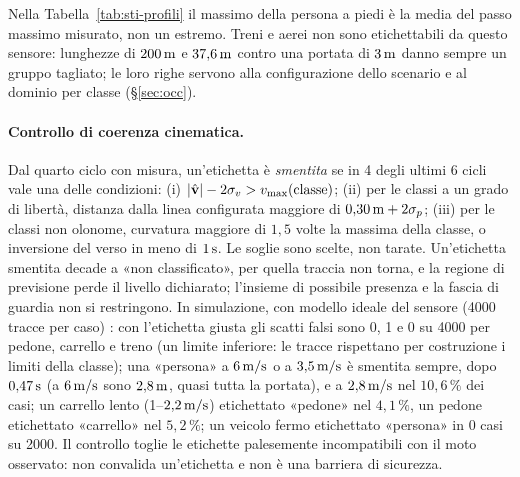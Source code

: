 Nella Tabella~\ref{tab:sti-profili} il massimo della persona a piedi è la media del passo massimo misurato, non un estremo. Treni e aerei non sono etichettabili da questo sensore: lunghezze di $200\,\mathrm{m}$ e $37{,}6\,\mathrm{m}$ contro una portata di $3\,\mathrm{m}$ danno sempre un gruppo tagliato; le loro righe servono alla configurazione dello scenario e al dominio per classe (\S\ref{sec:occ}).

\paragraph{Controllo di coerenza cinematica.} Dal quarto ciclo con misura, un'etichetta è \emph{smentita} se in 4 degli ultimi 6 cicli vale una delle condizioni: (i) $|\hat{\mathbf v}|-2\sigma_v>v_{\max}(\text{classe})$; (ii) per le classi a un grado di libertà, distanza dalla linea configurata maggiore di $0{,}30\,\mathrm{m}+2\sigma_p$; (iii) per le classi non olonome, curvatura maggiore di $1{,}5$ volte la massima della classe, o inversione del verso in meno di $1\,\mathrm{s}$. Le soglie sono scelte, non tarate. Un'etichetta smentita decade a «non classificato», per quella traccia non torna, e la regione di previsione perde il livello dichiarato; l'insieme di possibile presenza e la fascia di guardia non si restringono. In simulazione, con modello ideale del sensore (4000 tracce per caso) : con l'etichetta giusta gli scatti falsi sono 0, 1 e 0 su 4000 per pedone, carrello e treno (un limite inferiore: le tracce rispettano per costruzione i limiti della classe); una «persona» a $6\,\mathrm{m/s}$ o a $3{,}5\,\mathrm{m/s}$ è smentita sempre, dopo $0{,}47\,\mathrm{s}$ (a $6\,\mathrm{m/s}$ sono $2{,}8\,\mathrm{m}$, quasi tutta la portata), e a $2{,}8\,\mathrm{m/s}$ nel $10{,}6\,\%$ dei casi; un carrello lento (1--$2{,}2\,\mathrm{m/s}$) etichettato «pedone» nel $4{,}1\,\%$, un pedone etichettato «carrello» nel $5{,}2\,\%$; un veicolo fermo etichettato «persona» in 0 casi su 2000. Il controllo toglie le etichette palesemente incompatibili con il moto osservato: non convalida un'etichetta e non è una barriera di sicurezza.

